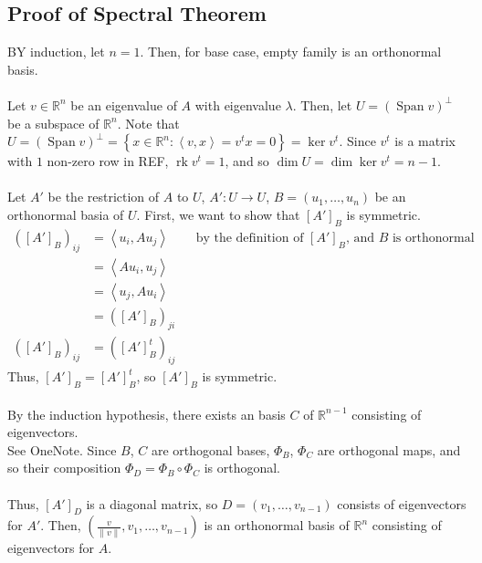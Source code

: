 \documentclass[letterpaper,12pt]{article}
\theoremstyle{definition}
\newcommand{\set}[1]{\left\{ #1 \right\}}
\DeclareMathOperator{\Span}{Span}
\DeclareMathOperator{\rk}{rk}
\newcommand{\inp}[2]{\left< #1, #2 \right>}
\newcommand{\norm}[1]{\| #1 \|}
\begin{document}
\subsection*{Proof of Spectral Theorem}
BY induction, let $n = 1$. Then, for base case, empty family is an orthonormal basis.
\\ \\ Let $v \in \mathbb{R}^n$ be an eigenvalue of $A$ with eigenvalue $\lambda$. Then, let $U = (\Span{v})^{\perp}$ be a subspace of $\mathbb{R}^n$. Note that $U = (\Span{v})^{\perp} = \set{x \in \mathbb{R}^n: \inp{v}{x} = v^t x = 0} = \ker{v^t}$. Since $v^t$ is a matrix with $1$ non-zero row in REF, $\rk{v^t} = 1$, and so $\dim{U} = \dim{\ker{v^t}} = n-1$.
\\ \\ Let $A'$ be the restriction of $A$ to $U$, $A': U \rightarrow U$, $B = (u_1, \dots, u_n)$ be an orthonormal basia of $U$. First, we want to show that $[A']_{B}$ is symmetric.
\begin{align*}
    ([A']_{B})_{ij} & = \inp{u_i}{Au_j} && \text{by the definition of $[A']_{B}$, and $B$ is orthonormal} \\
    & = \inp{Au_i}{u_j} \\
    & = \inp{u_j}{Au_i} \\
    & = ([A']_{B})_{ji} \\
    ([A']_{B})_{ij} & = ([A']_{B}^{t})_{ij}
\end{align*}
Thus, $[A']_{B} = [A']_{B}^{t}$, so $[A']_{B}$ is symmetric.
\\ \\ By the induction hypothesis, there exists an basis $C$ of $\mathbb{R}^{n-1}$ consisting of eigenvectors.
\\ See OneNote. Since $B$, $C$ are orthogonal bases, $\Phi_{B}$, $\Phi_{C}$ are orthogonal maps, and so their composition $\Phi_{D} = \Phi_{B} \circ \Phi_{C}$ is orthogonal.
\\ \\ Thus, $[A']_{D}$ is a diagonal matrix, so $D = (v_1, \dots, v_{n-1})$ consists of eigenvectors for $A'$. Then, $(\frac{v}{\norm{v}}, v_1, \dots, v_{n-1})$ is an orthonormal basis of $\mathbb{R}^n$ consisting of eigenvectors for $A$.
\end{document}

